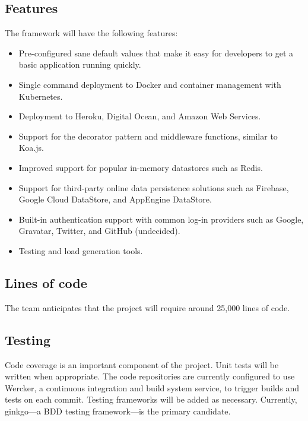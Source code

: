 \documentclass{article}
\begin{document}
\subsection{Features}

The framework will have the following features:

\begin{itemize}
	\item Pre-configured sane default values that make it easy for developers to get a basic application running quickly.
	\item Single command deployment to Docker and container management with Kubernetes.
    \item Deployment to Heroku, Digital Ocean, and Amazon Web Services.
    \item Support for the decorator pattern and middleware functions, similar to Koa.js.
    \item Improved support for popular in-memory datastores such as Redis.
	\item Support for third-party online data persistence solutions such as Firebase, Google Cloud DataStore, and AppEngine DataStore.
    \item Built-in authentication support with common log-in providers such as Google, Gravatar, Twitter, and GitHub (undecided). 
    \item Testing and load generation tools.
\end{itemize}

\subsection{Lines of code}

The team anticipates that the project will require around 25,000 lines of code.

\subsection{Testing}

Code coverage is an important component of the project. Unit tests will be written when appropriate. The code repositories are currently configured to use Wercker, a continuous integration and build system service, to trigger builds and tests on each commit. Testing frameworks will be added as necessary. Currently, ginkgo---a BDD testing framework---is the primary candidate.
\end{document}
